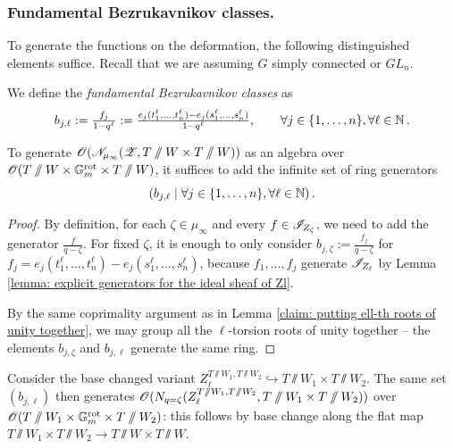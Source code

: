\subsubsection{Fundamental Bezrukavnikov classes.}
To generate the functions on the deformation, the following distinguished elements suffice. Recall that we are assuming $G$ simply connected or $GL_n$.
\begin{definition}
We define the \textit{fundamental Bezrukavnikov classes} as
\begin{equation*}
    b_{j, \ell} := \tfrac{f_j}{1-q^{\ell}} := \tfrac{e_j(t_1^{\ell}, \dots, t_n^{\ell}) - e_j(s_1^{\ell}, \dots, s_n^{\ell})}{1 - q^{\ell}}, \qquad \forall j \in \{ 1, \dots, n\}, \forall \ell \in \operatorname{\mathbb{N}}. 
\end{equation*}
\end{definition}

\begin{lemma}\label{lemma: fundamental bezrukavnikov classes}
To generate $\operatorname{\mathscr{O}}(\mathscr{N}_{\mu_{\infty}}(\operatorname{\mathscr{Z}}, T\sslash W \times T \sslash W))$ as an algebra over $\operatorname{\mathscr{O}}(T\sslash W \times \mathbb{G}_m^{\mathrm{rot}} \times T \sslash W)$, it suffices to add the infinite set of ring generators
\begin{equation*}
    \left( b_{j, \ell} \mid \forall j \in \{ 1, \dots, n\}, \forall \ell \in \operatorname{\mathbb{N}} \right). 
\end{equation*}
\end{lemma}
\begin{proof}
By definition, for each $\zeta \in \mu_{\infty}$ and every $f \in \mathscr{I}_{Z_{\zeta}}$, we need to add the generator $\tfrac{f}{q-\zeta}$. For fixed $\zeta$, it is enough to only consider $b_{j, \zeta} := \tfrac{f_j}{q-\zeta}$ for $f_j = e_j(t_1^{\ell}, \dots, t_n^{\ell}) - e_j(s_1^{\ell}, \dots, s_n^{\ell})$, because $f_1, \dots, f_j$ generate $\mathscr{I}_{Z_{\ell}}$ by Lemma \ref{lemma: explicit generators for the ideal sheaf of Zl}.

By the same coprimality argument as in Lemma \ref{claim: putting ell-th roots of unity together}, we may group all the $\ell$-torsion roots of unity together -- the elements $b_{j, \zeta}$ and $b_{j, \ell}$ generate the same ring.
\end{proof}

\begin{remark}
Consider the base changed variant $Z^{T\sslash W_1, T \sslash W_2}_{\ell} \hookrightarrow T\sslash W_1 \times T \sslash W_2$. The same set $(b_{j, \ell})$ then generates $\operatorname{\mathscr{O}}(N_{q=\zeta}(Z^{T\sslash W_1, T \sslash W_2}_{\ell}, T\sslash W_1 \times T \sslash W_2))$ over $\operatorname{\mathscr{O}}(T\sslash W_1 \times \mathbb{G}_m^{\mathrm{rot}} \times T \sslash W_2)$: this follows by base change along the flat map $T\sslash W_1 \times T \sslash W_2 \to T\sslash W \times T \sslash W$.  
\end{remark}



